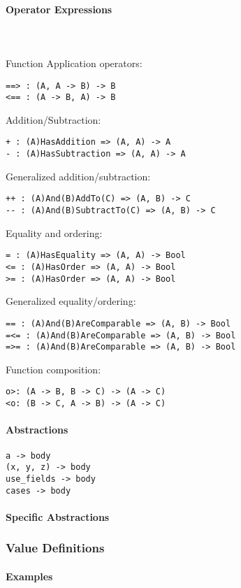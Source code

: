 \documentclass{article}
\begin{document}
\paragraph{Operator Expressions}\mbox{} \\\\
Function Application operators: 
\begin{verbatim}
==> : (A, A -> B) -> B
<== : (A -> B, A) -> B
\end{verbatim}
Addition/Subtraction:
\begin{verbatim}
+ : (A)HasAddition => (A, A) -> A
- : (A)HasSubtraction => (A, A) -> A
\end{verbatim}
Generalized addition/subtraction:
\begin{verbatim}
++ : (A)And(B)AddTo(C) => (A, B) -> C
-- : (A)And(B)SubtractTo(C) => (A, B) -> C
\end{verbatim}
Equality and ordering:
\begin{verbatim}
= : (A)HasEquality => (A, A) -> Bool
<= : (A)HasOrder => (A, A) -> Bool
>= : (A)HasOrder => (A, A) -> Bool
\end{verbatim}
Generalized equality/ordering:
\begin{verbatim}
== : (A)And(B)AreComparable => (A, B) -> Bool
=<= : (A)And(B)AreComparable => (A, B) -> Bool
=>= : (A)And(B)AreComparable => (A, B) -> Bool
\end{verbatim}
Function composition:
\begin{verbatim}
o>: (A -> B, B -> C) -> (A -> C)
<o: (B -> C, A -> B) -> (A -> C)
\end{verbatim}

\paragraph{Abstractions}

\begin{verbatim}
a -> body
(x, y, z) -> body
use_fields -> body
cases -> body
\end{verbatim}

\paragraph{Specific Abstractions}

\subsubsection{Value Definitions}

\paragraph{Examples}
\end{document}
